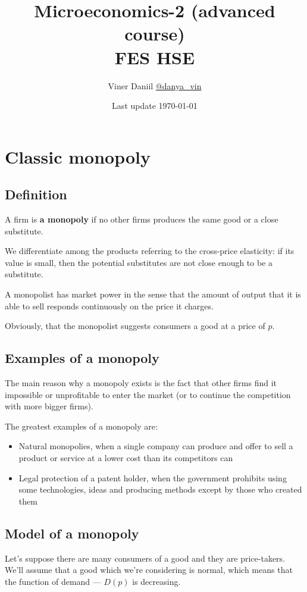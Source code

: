 \documentclass[a4paper, 10pt]{article}
\title{\LARGE{Microeconomics-2 (advanced course)}\\
FES HSE}
\author{Viner Daniil  \href{https://t.me/danya_vin}{@danya\_vin}}
\date{Last update \today}
\begin{document}
\maketitle
\tableofcontents
\newpage
\setlength{\parindent}{15pt}
\setlength{\parskip}{2mm}
\section{Classic monopoly}
\subsection{Definition}
A firm is \textbf{a monopoly} if no other firms produces the same good or a close substitute.

\comment We differentiate among the products referring to the cross-price elasticity: if its value is small, then the potential substitutes are not close enough to be a substitute.

A monopolist has market power in the sense that the amount of output that it is able to sell responds continuously on the price it charges.

Obviously, that the monopolist suggests consumers a good at a price of $p$. 

\subsection{Examples of a monopoly}
The main reason why a monopoly exists is the fact that other firms find it impossible or unprofitable to enter the market (or to continue the competition with more bigger firms).

The greatest examples of a monopoly are:
\begin{itemize}
    \item Natural monopolies, when a single company can produce and offer to sell a product or service at a lower cost than its competitors can
    \item Legal protection of a patent holder, when the government prohibits using some technologies, ideas and producing methods except by those who created them
\end{itemize}


\subsection{Model of a monopoly}
Let’s suppose there are many consumers of a good and they are price-takers. We'll assume that a good which we're considering is normal, which means that the function of demand — $D(p)$ is decreasing.
\end{document}
